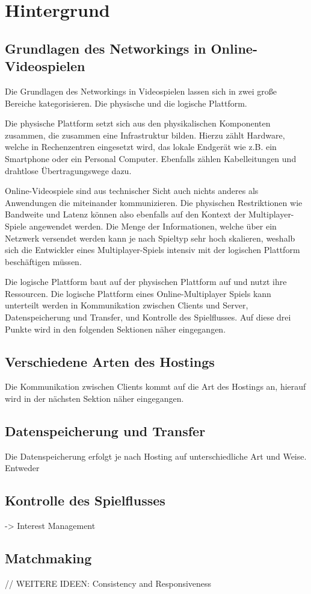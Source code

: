 
\chapter{Hintergrund}
\label{sec:hintergrund}

\section{Grundlagen des Networkings in Online-Videospielen}

Die Grundlagen des Networkings in Videospielen lassen sich in zwei große Bereiche kategorisieren. Die physische und die logische Plattform. 

Die physische Plattform setzt sich aus den physikalischen Komponenten zusammen, die zusammen eine Infrastruktur bilden. Hierzu zählt Hardware, welche in Rechenzentren eingesetzt wird, das lokale Endgerät wie z.B. ein Smartphone oder ein Personal Computer. Ebenfalls zählen Kabelleitungen und drahtlose Übertragungswege dazu. 

Online-Videospiele sind aus technischer Sicht auch nichts anderes als Anwendungen die miteinander kommunizieren. Die physischen Restriktionen wie Bandweite und Latenz können also ebenfalls auf den Kontext der Multiplayer-Spiele angewendet werden. Die Menge der Informationen, welche über ein Netzwerk versendet werden kann je nach Spieltyp sehr hoch skalieren, weshalb sich die Entwickler eines Multiplayer-Spiels intensiv mit der logischen Plattform beschäftigen müssen.

Die logische Plattform baut auf der physischen Plattform auf und nutzt ihre Ressourcen. Die logische Plattform eines Online-Multiplayer Spiels kann unterteilt werden in Kommunikation zwischen Clients und Server, Datenspeicherung und Transfer, und Kontrolle des Spielflusses. Auf diese drei Punkte wird in den folgenden Sektionen näher eingegangen.


\section{Verschiedene Arten des Hostings}

Die Kommunikation zwischen Clients kommt auf die Art des Hostings an, hierauf wird in der nächsten Sektion näher eingegangen.

\section{Datenspeicherung und Transfer}

Die Datenspeicherung erfolgt je nach Hosting auf unterschiedliche Art und Weise. Entweder

\section{Kontrolle des Spielflusses}

-> Interest Management


\section{Matchmaking}


// WEITERE IDEEN: Consistency and Responsiveness